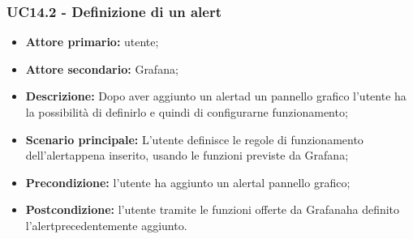 \documentclass[a4]{article}
\begin{document}
	\subsubsection{UC14.2 - Definizione di un alert}
	\begin{itemize}
		\item \textbf{Attore primario:} utente;
		\item \textbf{Attore secondario:} Grafana\glo;
		\item \textbf{Descrizione:} Dopo aver aggiunto un alert\glosp ad un pannello grafico l'utente ha la possibilità di definirlo e quindi di configurarne funzionamento;
		\item \textbf{Scenario principale:} L'utente definisce le regole di funzionamento dell'alert\glosp appena inserito, usando le funzioni previste da Grafana\glo;
		\item \textbf{Precondizione:} l'utente ha aggiunto un alert\glosp al pannello grafico;
		\item \textbf{Postcondizione:} l'utente tramite le funzioni offerte da Grafana\glosp ha definito l'alert\glosp precedentemente aggiunto.
	\end{itemize}
\end{document}
